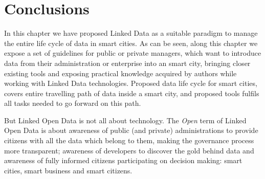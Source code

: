 \section{Conclusions}

In this chapter we have proposed Linked Data as a suitable paradigm to manage the entire life cycle of data in smart cities. As can be seen, along this chapter we expose a set of guidelines for public or private managers, which want to introduce data from their administration or enterprise into an smart city, bringing closer existing tools and exposing practical knowledge acquired by authors while working with Linked Data technologies. Proposed data life cycle for smart cities, covers entire travelling path of data inside a smart city, and proposed tools fulfils all tasks needed to go forward on this path.

But Linked Open Data is not all about technology. The \textit{Open} term of Linked Open Data is about awareness of public (and private) administrations to provide citizens with all the data which belong to them, making the governance process more transparent; awareness of developers to discover the gold behind data and awareness of fully informed citizens participating on decision making: smart cities, smart business and smart citizens.
